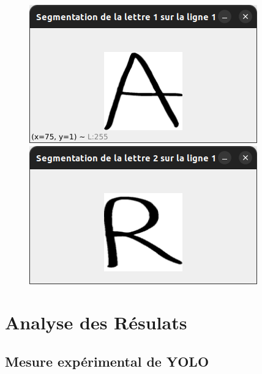 \documentclass[a4paper]{article}
\begin{document}
\begin{figure}[h!]
				\centering
				\includegraphics[scale=.3]{segmentation_A.png}
				\centering
				\includegraphics[scale=.3]{segmentation_R.png}
				\centering
			\end{figure}
	\newpage
	\section{Analyse des Résulats}
		\subsection{Mesure expérimental de YOLO}
\end{document}
